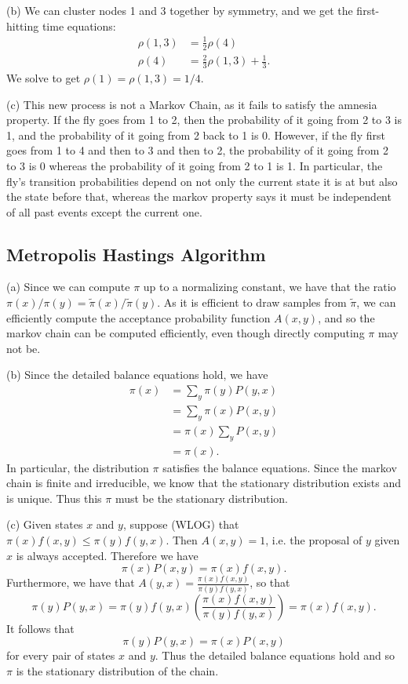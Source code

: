 (b) We can cluster nodes 1 and 3 together by symmetry, and we get the first-hitting time equations:
\begin{align*}
    \rho(1, 3) &= \frac{1}{2}\rho(4) \\
    \rho(4) &= \frac{2}{3}\rho(1, 3) + \frac{1}{3}.
\end{align*}
We solve to get $\rho(1) = \rho(1, 3) = 1/4$.

(c) This new process is not a Markov Chain, as it fails to satisfy the amnesia property. If the fly goes from 1 to 2, then the probability of it going from 2 to 3 is 1, and the probability of it going from 2 back to 1 is 0. However, if the fly first goes from 1 to 4 and then to 3 and then to 2, the probability of it going from 2 to 3 is 0 whereas the probability of it going from 2 to 1 is 1. In particular, the fly's transition probabilities depend on not only the current state it is at but also the state before that, whereas the markov property says it must be independent of all past events except the current one.


\subsection{Metropolis Hastings Algorithm}
(a) Since we can compute $\pi$ up to a normalizing constant, we have that the ratio $\pi(x)/\pi(y) = \tilde{\pi}(x)/\tilde{\pi}(y)$. As it is efficient to draw samples from $\tilde{\pi}$, we can efficiently compute the acceptance probability function $A(x, y)$, and so the markov chain can be computed efficiently, even though directly computing $\pi$ may not be.

(b) Since the detailed balance equations hold, we have
\begin{align*}
    \pi(x) &= \sum_y \pi(y)P(y, x) \\
        &= \sum_y \pi(x)P(x, y) \\
        &= \pi(x)\sum_y P(x, y) \\
        &= \pi(x).
\end{align*}
In particular, the distribution $\pi$ satisfies the balance equations. Since the markov chain is finite and irreducible, we know that the stationary distribution exists and is unique. Thus this $\pi$ must be the stationary distribution.

(c) Given states $x$ and $y$, suppose (WLOG) that $\pi(x)f(x, y) \leq \pi(y)f(y, x)$. Then $A(x, y) = 1$, i.e. the proposal of $y$ given $x$ is always accepted. Therefore we have
\[
\pi(x)P(x, y) = \pi(x)f(x, y).
\]
Furthermore, we have that $A(y, x) = \frac{\pi(x)f(x, y)}{\pi(y)f(y, x)}$, so that
\[
\pi(y)P(y, x) = \pi(y)f(y, x)\left(\frac{\pi(x)f(x, y)}{\pi(y)f(y, x)}\right) = \pi(x)f(x, y).
\]
It follows that 
\[
\pi(y)P(y, x) = \pi(x)P(x, y)
\]
for every pair of states $x$ and $y$. Thus the detailed balance equations hold and so $\pi$ is the stationary distribution of the chain.

